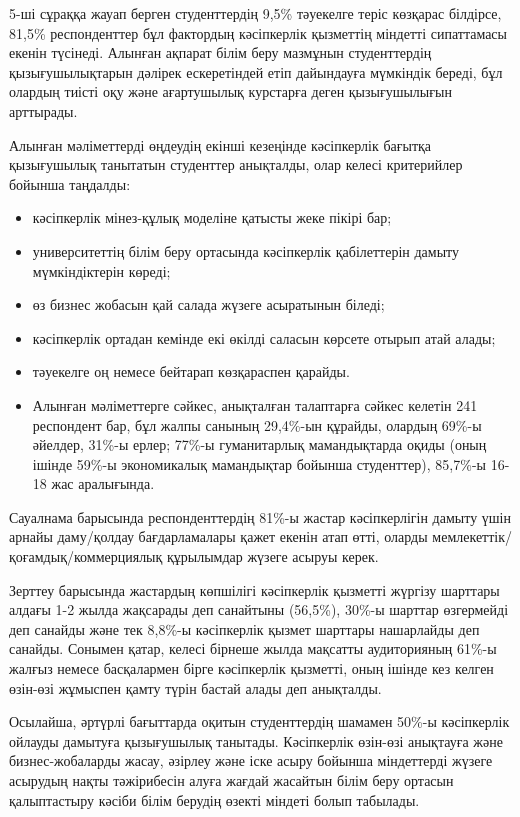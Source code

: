 5-ші сұраққа жауап берген студенттердің 9,5\% тәуекелге теріс көзқарас
білдірсе, 81,5\% респонденттер бұл фактордың кәсіпкерлік қызметтің
міндетті сипаттамасы екенін түсінеді. Алынған ақпарат білім беру
мазмұнын студенттердің қызығушылықтарын дәлірек ескеретіндей етіп
дайындауға мүмкіндік береді, бұл олардың тиісті оқу және ағартушылық
курстарға деген қызығушылығын арттырады.

Алынған мәліметтерді өңдеудің екінші кезеңінде кәсіпкерлік бағытқа
қызығушылық танытатын студенттер анықталды, олар келесі критерийлер
бойынша таңдалды:

\begin{itemize}
\item
  кәсіпкерлік мінез-құлық моделіне қатысты жеке пікірі бар;
\item
  университеттің білім беру ортасында кәсіпкерлік қабілеттерін дамыту
  мүмкіндіктерін көреді;
\item
  өз бизнес жобасын қай салада жүзеге асыратынын біледі;
\item
  кәсіпкерлік ортадан кемінде екі өкілді саласын көрсете отырып атай
  алады;
\item
  тәуекелге оң немесе бейтарап көзқараспен қарайды.
\item
  Алынған мәліметтерге сәйкес, анықталған талаптарға сәйкес келетін 241
  респондент бар, бұл жалпы санының 29,4\%-ын құрайды, олардың 69\%-ы
  әйелдер, 31\%-ы ерлер; 77\%-ы гуманитарлық мамандықтарда оқиды (оның
  ішінде 59\%-ы экономикалық мамандықтар бойынша студенттер), 85,7\%-ы
  16-18 жас аралығында.
\end{itemize}

Сауалнама барысында респонденттердің 81\%-ы жастар кәсіпкерлігін дамыту
үшін арнайы даму/қолдау бағдарламалары қажет екенін атап өтті, оларды
мемлекеттік/қоғамдық/коммерциялық құрылымдар жүзеге асыруы керек.

Зерттеу барысында жастардың көпшілігі кәсіпкерлік қызметті жүргізу
шарттары алдағы 1-2 жылда жақсарады деп санайтыны (56,5\%), 30\%-ы
шарттар өзгермейді деп санайды және тек 8,8\%-ы кәсіпкерлік қызмет
шарттары нашарлайды деп санайды. Сонымен қатар, келесі бірнеше жылда
мақсатты аудиторияның 61\%-ы жалғыз немесе басқалармен бірге кәсіпкерлік
қызметті, оның ішінде кез келген өзін-өзі жұмыспен қамту түрін бастай
алады деп анықталды.

Осылайша, әртүрлі бағыттарда оқитын студенттердің шамамен 50\%-ы
кәсіпкерлік ойлауды дамытуға қызығушылық танытады. Кәсіпкерлік өзін-өзі
анықтауға және бизнес-жобаларды жасау, әзірлеу және іске асыру бойынша
міндеттерді жүзеге асырудың нақты тәжірибесін алуға жағдай жасайтын
білім беру ортасын қалыптастыру кәсіби білім берудің өзекті міндеті
болып табылады.

